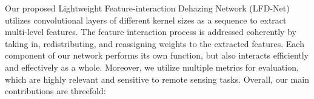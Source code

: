 \documentclass[lettersize,journal]{IEEEtran}
\begin{document}

Our proposed Lightweight Feature-interaction Dehazing Network (LFD-Net) utilizes convolutional layers of different kernel sizes as a sequence to extract multi-level features. The feature interaction process is addressed coherently by taking in, redistributing, and reassigning weights to the extracted features. Each component of our network performs its own function, but also interacts efficiently and effectively as a whole. Moreover, we utilize multiple metrics for evaluation, which are highly relevant and sensitive to remote sensing tasks. Overall, our main contributions are threefold:
\end{document}
